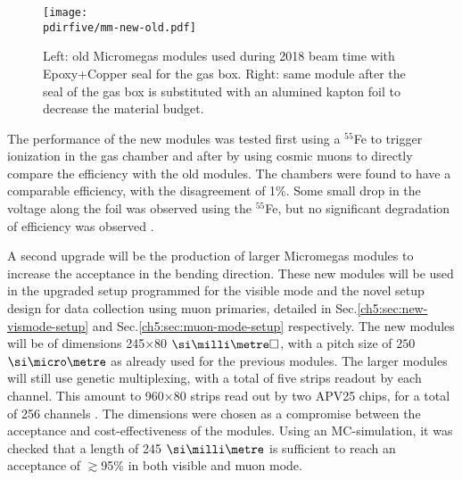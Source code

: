 \begin{figure}[bth!]
  \centering
  \texttt{[image: \\pdirfive/mm-new-old.pdf]}
  \caption[old and new Micromegas design of the gas box seal]{Left: old Micromegas modules used during 2018 beam time with Epoxy+Copper seal for the gas box. Right: same module after the seal of the gas box is substituted with an alumined kapton foil to decrease the material budget.}
  \label{fig:mm-old-new}
\end{figure}

The performance of the new modules was tested first using a $^{55}$Fe to trigger ionization in the gas chamber and after by using cosmic muons to directly compare the efficiency with the old modules. The chambers were found to have a comparable efficiency, with the disagreement of 1\%. Some small drop in the voltage along the foil was observed using the $^{55}$Fe, but no significant degradation of efficiency was observed \cite{philip-swork}.

A second upgrade will be the production of larger Micromegas modules to increase the acceptance in the bending direction. These new modules will be used in the upgraded setup programmed for the visible mode and the novel setup design for data collection using muon primaries, detailed in Sec.\ref{ch5:sec:new-vismode-setup} and Sec.\ref{ch5:sec:muon-mode-setup} respectively. The new modules will be of dimensions 245$\times$80 $\mms$, with a pitch size of $250$ $\mum$ as already used for the previous modules. The larger modules will still use genetic multiplexing, with a total of five strips readout by each channel. This amount to  960$\times$80 strips read out by two APV25 chips, for a total of 256 channels \cite{apv-useguide}. The dimensions were chosen as a compromise between the acceptance and cost-effectiveness of the modules. Using an MC-simulation, it was checked that a length of 245 $\mmi$ is sufficient to reach an acceptance of $\gtrsim$95\% in both visible and muon mode.

